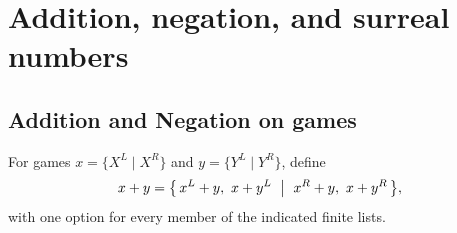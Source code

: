 \chapter{Addition, negation, and surreal numbers}

\section{Addition and Negation on games}

\begin{definition}
  \label{def:game-add}
  \leanok
  For games \(x=\{X^L\mid X^R\}\) and \(y=\{Y^L\mid Y^R\}\), define
  \[
    x+y=
    \bigl\{\,x^L+y,\ x+y^L\ \bigm|\ x^R+y,\ x+y^R\,\bigr\},
  \]
  with one option for every member of the indicated finite lists.
\end{definition}

